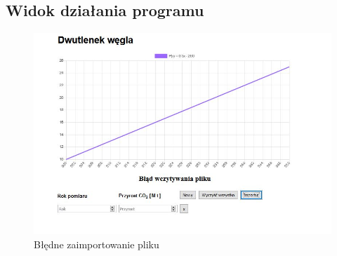 \documentclass[12pt]{article}
\begin{document}
\subsection{Widok działania programu}
\begin{figure}
\centering
\includegraphics[scale=0.65]{errorPic.jpg}
\caption{Błędne zaimportowanie pliku}
\end{figure}
\end{document}
